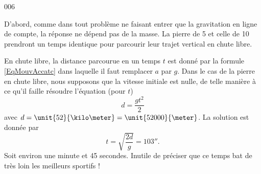 

\begin{corrige}{006}

D'abord, comme dans tout problème ne faisant entrer que la gravitation en ligne de compte, la réponse ne dépend pas de la masse. La pierre de \unit{5}{\kilogram} et celle de \unit{10}{\kilogram} prendront un temps identique pour parcourir leur trajet vertical en chute libre.

En chute libre, la distance parcourue en un temps $t$ est donné par la formule \eqref{EqMouvAccatc} dans laquelle il faut remplacer $a$ par $g$. Dans le cas de la pierre en chute libre, nous supposons que la vitesse initiale est nulle, de telle manière à ce qu'il faille résoudre l'équation (pour $t$)
\[ 
  d=\frac{ gt^2 }{ 2 }
\]
avec $d=\unit{52}{\kilo\meter}=\unit{52000}{\meter}$. La solution est donnée par
\[ 
  t=\sqrt{\frac{ 2d }{ g }}=\unit{103}{\second}.
\]
Soit environ une minute et 45 secondes. Inutile de préciser que ce temps bat de très loin les meilleurs sportifs !

\end{corrige}
